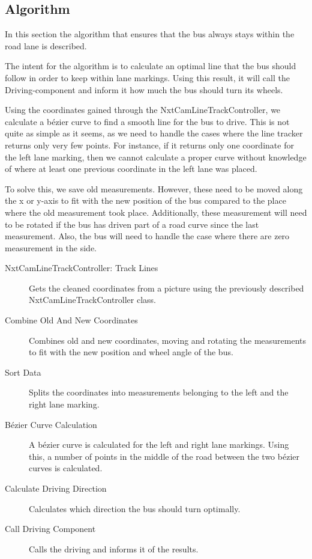 \subsection{Algorithm}
In this section the algorithm that ensures that the bus always stays within the road lane is described. 

The intent for the algorithm is to calculate an optimal line that the bus should follow in order to keep within lane markings. Using this result, it will call the Driving-component and inform it how much the bus should turn its wheels. 

Using the coordinates gained through the NxtCamLineTrackController, we calculate a bézier curve to find a smooth line for the bus to drive. This is not quite as simple as it seems, as we need to handle the cases where the line tracker returns only very few points. For instance, if it returns only one coordinate for the left lane marking, then we cannot calculate a proper curve without knowledge of where at least one previous coordinate in the left lane was placed. 

To solve this, we save old measurements. However, these need to be moved along the x or y-axis to fit with the new position of the bus compared to the place where the old measurement took place. Additionally, these measurement will need to be rotated if the bus has driven part of a road curve since the last measurement. Also, the bus will need to handle the case where there are zero measurement in the side.


\begin{description}
    \item[NxtCamLineTrackController: Track Lines]
    Gets the cleaned coordinates from a picture using the previously described NxtCamLineTrackController class. 
    \item[Combine Old And New Coordinates]
    Combines old and new coordinates, moving and rotating the measurements to fit with the new position and wheel angle of the bus. 
    \item[Sort Data]
    Splits the coordinates into measurements belonging to the left and the right lane marking. 
    \item[Bézier Curve Calculation]
    A bézier curve is calculated for the left and right lane markings. Using this, a number of points in the middle of the road between the two bézier curves is calculated.
    \item[Calculate Driving Direction]
    Calculates which direction the bus should turn optimally. 
    \item[Call Driving Component]
    Calls the driving and informs it of the results.
\end{description}

